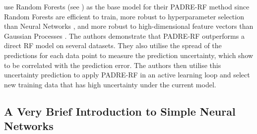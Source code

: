 \newpar \citeauthor{padre-rf-2021} use Random Forests (see ) as the base model for their PADRE-RF method since Random Forests are efficient to train, more robust to hyperparameter selection than Neural Networks \cite{ml-hyperparameters-2021}, and more robust to high-dimensional feature vectors than Gaussian Processes \cite{gp-dimensionality-2005}. The authors demonstrate that PADRE-RF outperforms a direct RF model on several datasets. They also utilise the spread of the predictions for each data point to measure the prediction uncertainty, which \citeauthor{padre-rf-2021} show to be correlated with the prediction error. The authors then utilise this uncertainty prediction to apply PADRE-RF in an active learning loop and select new training data that has high uncertainty under the current model.

\subsection{A Very Brief Introduction to Simple Neural Networks} \label{txt:neural-network}

